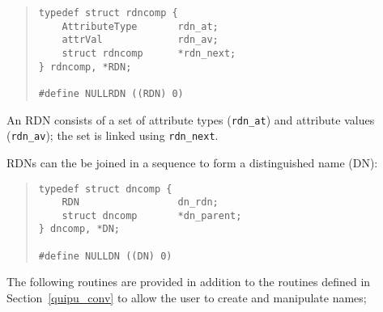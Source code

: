 \begin{quote}\small\begin{verbatim}
typedef struct rdncomp {       
    AttributeType       rdn_at;
    attrVal             rdn_av;
    struct rdncomp      *rdn_next;
} rdncomp, *RDN;

#define NULLRDN ((RDN) 0)
\end{verbatim}\end{quote}

An RDN consists of a set of attribute types 
(\verb"rdn_at")
and attribute values 
(\verb"rdn_av");
the set is linked using \verb"rdn_next".

RDNs can the be joined in a sequence to form a distinguished name
(DN):
\begin{quote}\small\begin{verbatim}
typedef struct dncomp {
    RDN                 dn_rdn;
    struct dncomp       *dn_parent;
} dncomp, *DN;

#define NULLDN ((DN) 0)
\end{verbatim}\end{quote}

The following routines are provided in addition to the routines defined in
Section~\ref{quipu_conv} to allow the user to create and manipulate names;

